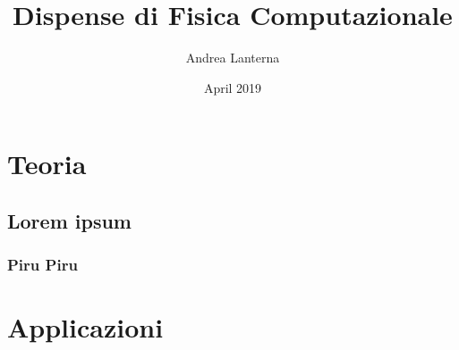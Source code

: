 \documentclass[a4paper,11pt]{book}
\title{Dispense di Fisica Computazionale}
\author{Andrea Lanterna}
\date{April 2019}
\begin{document}
\maketitle

	\frontmatter
		\maketitle
		\tableofcontents
	\mainmatter
		\part{Teoria}
		    \chapter{Lorem ipsum}
		        \section{Piru Piru}
    		        \lipsum
    		        
    		        \lipsum
		\part{Applicazioni}
	\backmatter
	    \listoffigures
        \listoftables
        
\end{document}
